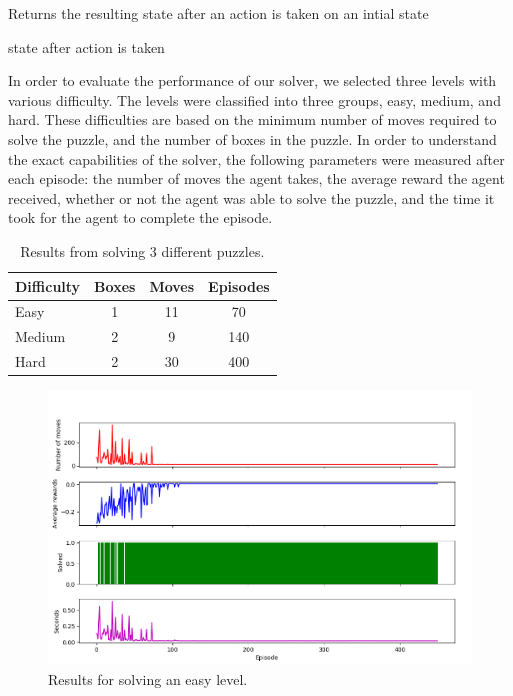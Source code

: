 \documentclass[times, 10pt,twocolumn]{article}
\begin{document}
\begin{algorithm}
  \caption{Returns the resulting state after an action is taken on an intial state}
  \begin{algorithmic}[6]
      \State \Return state after action is taken
    \EndFunction
  \end{algorithmic}
\end{algorithm}


In order to evaluate the performance of our solver, we selected three levels with various difficulty. The levels were classified into three groups, easy, medium, and hard. These difficulties are based on the minimum number of moves required to solve the puzzle, and the number of boxes in the puzzle. In order to understand the exact capabilities of the solver, the following parameters were measured after each episode: the number of moves the agent takes, the average reward the agent received, whether or not the agent was able to solve the puzzle, and the time it took for the agent to complete the episode. 

\begin{table}[htbp]
  \centering
  \begin{tabular}{l c c c} \hline\hline
    Difficulty & Boxes & Moves & Episodes \\ \hline
    Easy & 1 & 11 & 70 \\
    Medium & 2 & 9 & 140 \\
    Hard & 2 & 30 & 400 \\ \hline\hline
  \end{tabular}
  \caption{Results from solving 3 different puzzles.}
  \label{table:results}
\end{table}

\begin{figure}[h] 
  \centering
     \includegraphics[width=\linewidth]{images/easy_graph.png}
  \caption{Results for solving an easy level.}
  \label{fig:e}
\end{figure}
\end{document}
